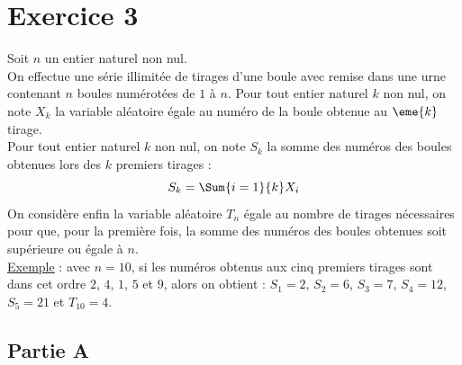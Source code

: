\documentclass[11pt]{article}%
\begin{document}
\section*{Exercice 3}
\noindent
Soit $n$ un entier naturel non nul.\\
On effectue une série illimitée de tirages d'une boule avec remise
dans une urne contenant $n$ boules numérotées de $1$ à $n$. Pour tout
entier naturel $k$ non nul, on note $X_k$ la variable aléatoire égale
au numéro de la boule obtenue au $\eme{k}$ tirage.\\
Pour tout entier naturel $k$ non nul, on note $S_k$ la somme des
numéros des boules obtenues lors des $k$ premiers tirages :
\[
S_k = \Sum{i=1}{k} X_i
\]
On considère enfin la variable aléatoire $T_n$ égale au nombre de
tirages nécessaires pour que, pour la première fois, la somme des
numéros des boules obtenues soit supérieure ou égale à $n$.\\[.2cm]
\underline{Exemple} : avec $n=10$, si les numéros obtenus aux cinq
premiers tirages sont dans cet ordre $2$, $4$, $1$, $5$ et $9$, alors
on obtient : $S_1=2$, $S_2=6$, $S_3=7$, $S_4=12$, $S_5=21$ et
$T_{10}=4$.

\subsection*{Partie A}
\end{document}
